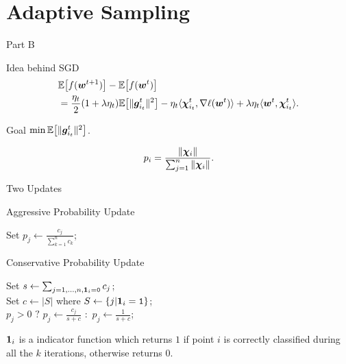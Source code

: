 \section{Adaptive Sampling}
\begin{frame}{Part B}
\Huge {}
\end{frame}

\begin{frame}{Idea behind SGD}
\begin{align*}
 &\mathbb{E}\big[f(\bm{w}^{t+1})\big] - \mathbb{E}\big[f(\bm{w}^{t})\big] \\
   &= \frac{\eta_t}{2}(1+\lambda \eta_t)\mathbb{E}\big[\|\bm{g}_{i_t}^t\|^2\big] - \eta_t \langle \bm{\chi}_{i_t}^t, \nabla \ell(\bm{w}^{t})\rangle + \lambda \eta_t \langle \bm{w}^{t}, \bm{\chi}_{i_t}^t \rangle.
\end{align*}

\begin{block}{Goal}
$\min \mathbb{E}\big[\|\bm{g}_{i_t}^t\|^2\big]$.
 \end{block}
\begin{equation}\label{eq:p_optimal}
    p_i = \frac{\|\bm{\chi}_i\|}{\sum_{j=1}^n \|\bm{\chi}_i\|}.
\end{equation}
\end{frame}

\begin{frame}{Two Updates}
\begin{algorithm}[H]
    \label{alg:AggUpdate}
    \caption{Aggressive Probability Update}
    \SetAlgoLined
     {
	Set $p_j \leftarrow \frac{c_j}{\sum_{k=1}^n c_k}$;
    }
    \end{algorithm}
\begin{algorithm}[H]    
    \label{alg:ConUpdate}
    \caption{Conservative Probability Update}
    \SetAlgoLined
    Set $s \leftarrow \sum_{j=1,\dots, n, \bm{1}_i=\texttt{0}} c_j$; \\
    Set $c \leftarrow |S|$ where $S \leftarrow \{j | \bm{1}_i=\texttt{1}\}$; \\
     {
	    $p_j>0$ $?$ {$p_j \leftarrow \frac{c_j}{s+c}$} $\colon$ {$p_j \leftarrow \frac{1}{s+c}$; } 
    } 
\end{algorithm} 
\Tiny $\bm{1}_i$ is a indicator function which returns $1$ if point $i$ is correctly classified during all the $k$ iterations, otherwise returns $0$.
\end{frame}

